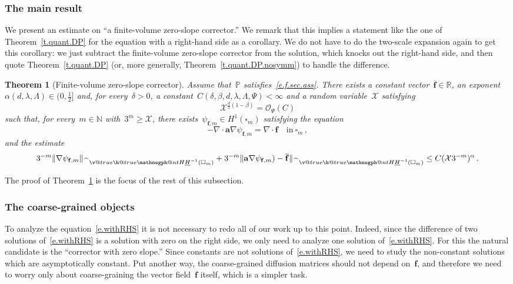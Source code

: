 \documentclass[11pt]{article} %
\makeatletter
\let\oldsquare\square %
\renewcommand{\square}{\oldsquare}
\numberwithin{equation}{section}
\newtheorem{theorem}{Theorem}[section]
\theoremstyle{definition}
\newcommand*{\N}{\ensuremath{\mathbb{N}}}
\newcommand*{\R}{\ensuremath{\mathbb{R}}}
\renewcommand*{\hat}{\widehat}
\newcommand{\f}{\mathbf{f}}
\renewcommand{\a}{\mathbf{a}}
\newcommand{\cu}{\square}
\renewcommand{\P}{\mathbb{P}}
\newcommand{\X}{\mathcal{X}}
\renewcommand{\O}{\mathcal{O}}
\newcommand{\negphantom}{\v@true\h@true\negph@nt}
\newcommand{\negph@nt}{\ifmmode\expandafter\mathpalette 
  \expandafter\mathnegph@nt\else\expandafter\makenegph@nt\fi}
\newcommand{\makenegph@nt}[1]{%
  \setbox\z@\hbox{\color@begingroup#1\color@endgroup}\finnegph@nt}
\newcommand{\finnegph@nt}{%
  \setbox\tw@\null 
  \ifv@ \ht\tw@\ht\z@\dp\tw@\dp\z@\fi \ifh@\wd\tw@-\wd\z@\fi\box\tw@}
\newcommand{\mathnegph@nt}[2]{%
  \setbox\z@\hbox{$\m@th #1{#2}$}\finnegph@nt}
\newcommand{\Hminusul}{\hat{\phantom{H}}\negphantom{H}\underline{H}^{-1}}
\makeatother
\begin{document}
\subsubsection{The main result}


We present an estimate on ``a finite-volume zero-slope corrector.'' 
We remark that this implies a statement like the one of Theorem~\ref{t.quant.DP} for the equation with a right-hand side as a corollary. We do not have to do the two-scale expansion again to get this corollary: we just subtract the finite-volume zero-slope corrector from the solution, which knocks out the right-hand side, and then quote Theorem~\ref{t.quant.DP} (or, more generally, Theorem~\ref{t.quant.DP.nosymm}) to handle the difference.

\begin{theorem}[Finite-volume zero-slope corrector]
\label{t.zeroslope}
\hspace{-4pt}
Assume that~$\P$ satisfies~\eqref{e.f.sec.ass}. 
\hspace{-6pt}
There exists a constant vector~$\overline{\f}\in\R$, an exponent~$\alpha(d,\lambda,\Lambda) \in (0,\tfrac12]$ and, for every~$\delta>0$, a constant~$C(\delta,\beta,d,\lambda,\Lambda,\Psi)<\infty$ and a random variable~$\X$ satisfying 
\begin{equation}
\label{e.mmmbound}
\X^{\frac d2 (1-\beta)}
= \O_\Psi(C)
\end{equation}
such that, for every~$m\in\N$ with~$3^m \geq \X$, there exists~$\psi_{\f,m} \in H^1(\cu_m)$ satisfying the equation
\begin{equation}
-\nabla \cdot \a\nabla \psi_{\f,m} = \nabla \cdot \f \quad \mbox{in} \ \cu_m\,,
\end{equation}
and the estimate
\begin{equation}
\label{e.zeroslope.sublin}
3^{-m}\| \nabla \psi_{\f,m} \|_{\Hminusul(\cu_m)} 
+
3^{-m}\| \a \nabla \psi_{\f,m}) - \overline{\f} \|_{\Hminusul(\cu_m)} 
\leq
C ( \X 3^{-m} )^{\alpha}\,.
\end{equation}
\end{theorem}

The proof of Theorem~\ref{t.zeroslope} is the focus of the rest of this subsection.

\subsubsection{The coarse-grained objects}

To analyze the equation~\eqref{e.withRHS} it is not necessary to redo all of our work up to this point. Indeed, since the difference of two solutions of~\eqref{e.withRHS} is a solution with zero on the right side, we only need to analyze one solution of~\eqref{e.withRHS}. For this the natural candidate is the ``corrector with zero slope.'' Since constants are not solutions of~\eqref{e.withRHS}, we need to study the non-constant solutions which are asymptotically constant. Put another way, the coarse-grained diffusion matrices should not depend on~$\f$, and therefore we need to worry only about coarse-graining the vector field~$\f$ itself, which is a simpler task. 
\end{document}
